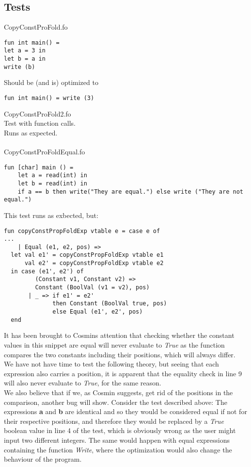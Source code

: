 \documentclass{article}
\begin{document}
\subsection{Tests}
CopyConstProFold.fo
\begin{lstlisting}
fun int main() =
let a = 3 in
let b = a in
write (b)
\end{lstlisting}
\noindent Should be (and is) optimized to
\begin{lstlisting}
fun int main() = write (3)
\end{lstlisting}
CopyConstProFold2.fo\\
Test with function calls.\\
Runs as expected.\\
\\
CopyConstProFoldEqual.fo\\
\begin{lstlisting}
fun [char] main () = 
    let a = read(int) in
    let b = read(int) in
    if a == b then write("They are equal.") else write ("They are not equal.")
\end{lstlisting}
This test runs as exbected, but:\\
\begin{lstlisting}
fun copyConstPropFoldExp vtable e = case e of
...
    | Equal (e1, e2, pos) =>
  let val e1' = copyConstPropFoldExp vtable e1
      val e2' = copyConstPropFoldExp vtable e2
  in case (e1', e2') of
         (Constant v1, Constant v2) =>
         Constant (BoolVal (v1 = v2), pos)
       | _ => if e1' = e2'
              then Constant (BoolVal true, pos)
              else Equal (e1', e2', pos)
  end
\end{lstlisting}
It has been brought to Cosmins attention that checking whether the constant values in this snippet are equal will never evaluate to \textit{True} as the function compares the two constants including their positions, which will always differ.\\
We have not have time to test the following theory, but seeing that each expression also carries a position, it is apparent that the equality check in line 9 will also never evaluate to \textit{True}, for the same reason.\\
We also believe that if we, as Cosmin suggests, get rid of the positions in the comparison, another bug will show.
Consider the test described above: The expressions \textbf{a} and \textbf{b} are identical and so they would be considered equal if not for their respective positions, and therefore they would be replaced by a \textit{True} boolean value in line 4 of the test, which is obviously wrong as the user might input two different integers. The same would happen with equal expressions containing the function \textit{Write}, where the optimization would also change the behaviour of the program.
\end{document}
